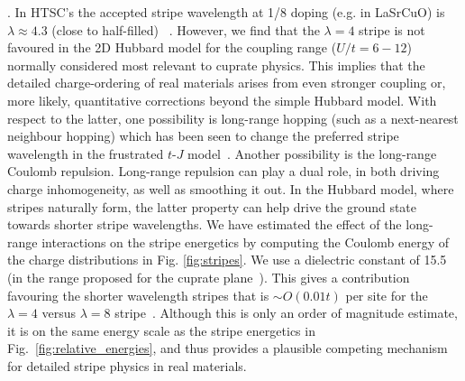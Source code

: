 \documentclass[12pt]{article}
\begin{document}

. 
In HTSC's the accepted stripe wavelength at 1/8 doping (e.g. in LaSrCuO) is $\lambda \approx 4.3$ (close to half-filled) ~\cite{tranquada1995evidence}.
{However, we find that the $\lambda=4$ stripe is
not favoured in the 2D Hubbard model for the coupling range ($U/t=6-12$) normally considered most relevant to cuprate physics}.
{This implies that the detailed charge-ordering of real materials arises from even stronger coupling or, more likely, quantitative corrections beyond the simple Hubbard model.}
{With respect to the latter,} one possibility is long-range hopping (such as a next-nearest neighbour hopping) which has been seen to change the preferred stripe wavelength
  in the frustrated $t$-$J$ model~\cite{dodaro2016intertwined}.
  Another possibility is the long-range Coulomb repulsion. Long-range repulsion
  can play a dual role, in both driving charge inhomogeneity, as well as smoothing it out.
  In the Hubbard model, where stripes naturally form, the
  latter property can help drive the ground state towards shorter stripe wavelengths.
  We have estimated the effect of the long-range interactions on the stripe energetics by computing
  the Coulomb energy of the charge distributions  in Fig. \ref{fig:stripes}. We use a dielectric constant of
  15.5 (in the range proposed for the cuprate plane~\cite{schuttler2001screening}). 
This gives a contribution favouring the shorter wavelength stripes that is $\sim O(0.01t)$
per site for the $\lambda=4$ versus $\lambda=8$ stripe~\cite{supplementary}. Although this is only an order of magnitude estimate, 
it is on the same energy scale as the stripe energetics in Fig.~\ref{fig:relative_energies}, and thus provides
a plausible competing mechanism for detailed stripe physics in real materials.
\end{document}
